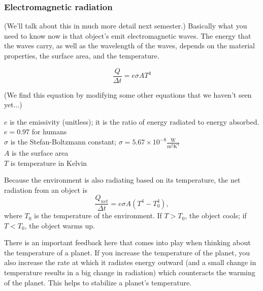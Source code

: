 \subsubsection{Electromagnetic radiation}
(We'll talk about this in much more detail next semester.) Basically what you need to know now is that object's emit electromagnetic waves. The energy that the waves carry, as well as the wavelength of the waves, depends on the material properties, the surface area, and the temperature.

$$\frac{Q}{\Delta{t}}=e\sigma AT^4$$

(We find this equation by modifying some other equations that we haven't seen yet...)

$e$ is the emissivity (unitless); it is the ratio of energy radiated to energy absorbed. $e=0.97$ for humans\\
$\sigma$ is the Stefan-Boltzmann constant; $\sigma=5.67\times 10^{-8}\frac{\mbox{W}}{\mbox{m}^2\mbox{K}^4}$\\
$A$ is the surface area\\
$T$ is temperature in Kelvin

Because the environment is also radiating based on its temperature, the net radiation from an object is
$$\frac{Q_{net}}{\Delta{t}}=e\sigma A(T^4-T_0^4),$$
where $T_0$ is the temperature of the environment. If $T>T_0$, the object cools; if $T<T_0$, the object warms up.

There is an important feedback here that comes into play when thinking about the temperature of a planet. If you increase the temperature of the planet, you also increase the rate at which it radiates energy outward (and a small change in temperature results in a big change in radiation) which counteracts the warming of the planet. This helps to stabilize a planet's temperature.





